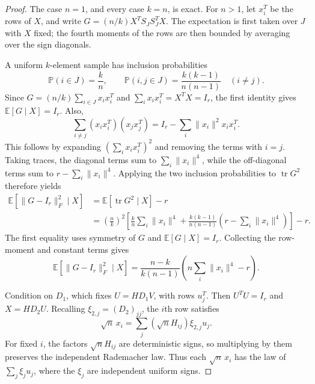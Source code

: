 \documentclass[11pt]{article}
\theoremstyle{definition}
\theoremstyle{remark}
\theoremstyle{plain}
\newcommand{\E}{\mathbb E}
\newcommand{\Prob}{\mathbb P}
\DeclareMathOperator{\tr}{tr}
\begin{document}
\begin{proof}
The case \(n=1\), and every case \(k=n\), is exact.
For \(n>1\), let \(x_i^T\) be the rows of \(X\), and write
\(G=(n/k)X^TS_JS_J^TX\). The expectation is first taken over $J$ with $X$
fixed; the fourth moments of the rows are then bounded by averaging over
the sign diagonals.

A uniform $k$-element sample has inclusion probabilities
\[
 \Prob(i\in J)=\frac kn,\qquad
 \Prob(i,j\in J)=\frac{k(k-1)}{n(n-1)}\quad(i\ne j).
\]
Since $G=(n/k)\sum_{i\in J}x_ix_i^T$ and
$\sum_i x_ix_i^T=X^TX=I_r$, the first identity gives
$\E[G\mid X]=I_r$. Also,
\[
 \sum_{i\ne j}(x_ix_i^T)(x_jx_j^T)
       =I_r-\sum_i\|x_i\|^2x_ix_i^T.
\]
This follows by expanding $(\sum_i x_ix_i^T)^2$ and removing the
terms with $i=j$. Taking traces, the diagonal terms sum to
$\sum_i\|x_i\|^4$, while the off-diagonal terms sum to
$r-\sum_i\|x_i\|^4$. Applying the two inclusion probabilities to
$\tr G^2$ therefore yields
\[
 \begin{aligned}
 \E[\|G-I_r\|_F^2\mid X]
   &=\E[\tr G^2\mid X]-r\\
   &=\left(\frac nk\right)^2
     \left[\frac kn\sum_i\|x_i\|^4
       +\frac{k(k-1)}{n(n-1)}
          \left(r-\sum_i\|x_i\|^4\right)\right]-r.
 \end{aligned}
\]
The first equality uses symmetry of $G$ and $\E[G\mid X]=I_r$.
Collecting the row-moment and constant terms gives
\begin{equation}\label{eq:conditional-sampling-moment}
 \E\!\left[\|G-I_r\|_F^2\mid X\right]
  =\frac{n-k}{k(n-1)}
                \left(n\sum_i\|x_i\|^4-r\right).
\end{equation}

Condition on $D_1$, which fixes $U=HD_1V$, with rows $u_j^T$.
Then $U^TU=I_r$ and $X=HD_2U$. Recalling
$\xi_{2,j}=(D_2)_{jj}$, the $i$th row satisfies
\[
 \sqrt n\,x_i=\sum_j(\sqrt n H_{ij})\xi_{2,j}u_j.
\]
For fixed $i$, the factors $\sqrt n H_{ij}$ are deterministic
signs, so multiplying by them preserves the independent Rademacher
law. Thus each $\sqrt n\,x_i$ has the law of $\sum_j\xi_j u_j$,
where the $\xi_j$ are independent uniform signs.


\end{proof}
\end{document}
